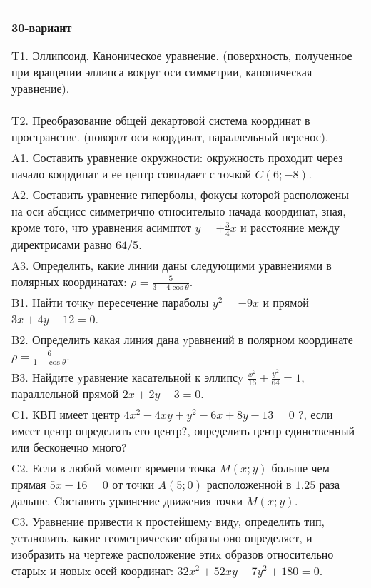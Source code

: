 \documentclass{article}
\begin{document}
\begin{tabular}{m{17cm}}
\textbf{30-вариант}
\newline

T1. Эллипсоид. Каноническое уравнение. (поверхность, полученное при вращении эллипса вокруг оси симметрии, каноническая уравнение).\\

T2. Преобразование общей декартовой система координат в пространстве. (поворот оси координат, параллельный перенос).\\

A1. Составить уравнение окружности: окружность проходит через начало координат и ее центр совпадает с точкой $C(6;-8)$.\\

A2. Составить уравнение гиперболы, фокусы которой расположены на оси абсцисс симметрично относительно начада координат, зная, кроме того, что уравнения асимптот $y=\pm \frac{3}{4}x$ и расстояние между директрисами равно $64/5$.\\

A3. Определить, какие линии даны следующими уравнениями в полярных координатах: $\rho=\frac{5}{3-4\cos\theta}$.\\

B1. Найти точкy пересечение параболы $y^{2} = - 9x$ и прямой $3x + 4y - 12 = 0$.  \\

B2. Определить какая линия дана yравнений в полярном координате $\rho = \frac{6}{1 - \cos\theta}$.  \\

B3. Найдите yравнение касательной к эллипсy $\frac{x^{2}}{16} + \frac{y^{2}}{64} = 1$, параллельной прямой $2x + 2y - 3 = 0$.  \\

C1. КВП имеет центр $4x^{2}-4xy+y^{2}-6x+8y+13=0$ ?, если имеет центр определить его центр?, определить центр единственный или бесконечно много?  \\

C2. Если в любой момент времени точка $M(x;y)$ больше чем прямая $5x-16=0$ от точки $A(5;0)$ расположенной в $1.25$ раза дальше. Cоставить yравнение движения точки $M(x;y)$.  \\

C3. Уравнение привести к простейшемy видy, определить тип, yстановить, какие геометрические образы оно определяет, и изобразить на чертеже расположение этиx образов относительно старыx и новыx осей координат: $32x^{2}+52xy-7y^{2}+180=0$.  \\

\end{tabular}
\vspace{1cm}
\end{document}
